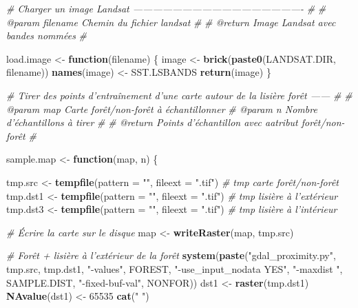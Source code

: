 \documentclass[a4paper, notitlepage, 12pt, krantz2]{krantz}
\newenvironment{Shaded}{\begin{snugshade}}{\end{snugshade}}
\newcommand{\CommentTok}[1]{\textcolor[rgb]{0.56,0.35,0.01}{\textit{#1}}}
\newcommand{\ControlFlowTok}[1]{\textcolor[rgb]{0.13,0.29,0.53}{\textbf{#1}}}
\newcommand{\DataTypeTok}[1]{\textcolor[rgb]{0.13,0.29,0.53}{#1}}
\newcommand{\DecValTok}[1]{\textcolor[rgb]{0.00,0.00,0.81}{#1}}
\newcommand{\KeywordTok}[1]{\textcolor[rgb]{0.13,0.29,0.53}{\textbf{#1}}}
\newcommand{\NormalTok}[1]{#1}
\newcommand{\StringTok}[1]{\textcolor[rgb]{0.31,0.60,0.02}{#1}}
\begin{document}
\begin{Shaded}
\begin{Highlighting}[]
\CommentTok{# Charger un image Landsat ----------------------------------------------------}
\CommentTok{#}
\CommentTok{# @param filename  Chemin du fichier landsat}
\CommentTok{#}
\CommentTok{# @return          Image Landsat avec bandes nommées }
\CommentTok{#}

\NormalTok{load.image <-}\StringTok{ }\ControlFlowTok{function}\NormalTok{(filename) \{}
\NormalTok{  image <-}\StringTok{ }\KeywordTok{brick}\NormalTok{(}\KeywordTok{paste0}\NormalTok{(LANDSAT.DIR, filename))}
  \KeywordTok{names}\NormalTok{(image) <-}\StringTok{ }\NormalTok{SST.LSBANDS}
  \KeywordTok{return}\NormalTok{(image)}
\NormalTok{\}}

\CommentTok{# Tirer des points d'entraînement d'une carte autour de la lisière forêt ------}
\CommentTok{#}
\CommentTok{# @param map       Carte forêt/non-forêt à échantillonner}
\CommentTok{# @param n         Nombre d'échantillons à tirer}
\CommentTok{#}
\CommentTok{# @return          Points d'échantillon avec aatribut forêt/non-forêt}
\CommentTok{#}

\NormalTok{sample.map <-}\StringTok{ }\ControlFlowTok{function}\NormalTok{(map, n) \{}
  
\NormalTok{  tmp.src  <-}\StringTok{ }\KeywordTok{tempfile}\NormalTok{(}\DataTypeTok{pattern =} \StringTok{""}\NormalTok{, }\DataTypeTok{fileext =} \StringTok{".tif"}\NormalTok{)    }\CommentTok{# tmp carte forêt/non-forêt}
\NormalTok{  tmp.dst1 <-}\StringTok{ }\KeywordTok{tempfile}\NormalTok{(}\DataTypeTok{pattern =} \StringTok{""}\NormalTok{, }\DataTypeTok{fileext =} \StringTok{".tif"}\NormalTok{)    }\CommentTok{# tmp lisière à l'extérieur}
\NormalTok{  tmp.dst3 <-}\StringTok{ }\KeywordTok{tempfile}\NormalTok{(}\DataTypeTok{pattern =} \StringTok{""}\NormalTok{, }\DataTypeTok{fileext =} \StringTok{".tif"}\NormalTok{)    }\CommentTok{# tmp lisière à l'intérieur}
  
  \CommentTok{# Écrire la carte sur le disque}
\NormalTok{  map <-}\StringTok{ }\KeywordTok{writeRaster}\NormalTok{(map, tmp.src)                        }
  
  \CommentTok{# Forêt + lisière à l'extérieur de la forêt}
  \KeywordTok{system}\NormalTok{(}\KeywordTok{paste}\NormalTok{(}\StringTok{"gdal_proximity.py"}\NormalTok{, tmp.src, tmp.dst1,    }
               \StringTok{"-values"}\NormalTok{, FOREST, }
               \StringTok{"-use_input_nodata YES"}\NormalTok{, }
               \StringTok{"-maxdist "}\NormalTok{,  SAMPLE.DIST, }
               \StringTok{"-fixed-buf-val"}\NormalTok{, NONFOR))}
\NormalTok{  dst1 <-}\StringTok{ }\KeywordTok{raster}\NormalTok{(tmp.dst1)}
  \KeywordTok{NAvalue}\NormalTok{(dst1) <-}\StringTok{ }\DecValTok{65535}
  \KeywordTok{cat}\NormalTok{(}\StringTok{"     "}\NormalTok{)}
  

\end{Highlighting}
\end{Shaded}
\end{document}
